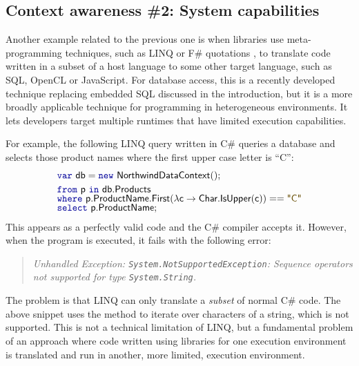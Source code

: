 
\subsection{Context awareness \#2: System capabilities}

Another example related to the previous one is when libraries use meta-programming techniques,
such as LINQ \cite{app-linq,app-linq-essence} or F\# quotations \cite{app-fsharp-metaprog}, to
translate code written in a subset of a host language to some other target language, such as SQL,
OpenCL or JavaScript. For database access, this is a recently developed technique replacing embedded
SQL discussed in the introduction, but it is a more broadly applicable technique for programming
in heterogeneous environments. It lets developers target multiple runtimes that have limited
execution capabilities.

For example, the following LINQ query written in C\# queries a database and
selects those product names where the first upper case letter is ``C'':
%
\begin{equation*}
\begin{array}{l}
\kvd{var}~\ident{db} = \kvd{new}~\ident{NorthwindDataContext}();\\[0.25em]
\kvd{from}~\ident{p}~\kvd{in}~\ident{db.Products}\\[-0.25em]
\kvd{where}~\ident{p.ProductName.First}(\lambda \ident{c} \rightarrow \ident{Char.IsUpper}(\ident{c})) == \str{C}\\[-0.25em]
\kvd{select}~\ident{p.ProductName};
\end{array}
\end{equation*}
%
This appears as a perfectly valid code and the C\# compiler accepts it. However, when the program
is executed, it fails with the following error:
%
\begin{quote}
\emph{Unhandled Exception: \texttt{System.NotSupportedException}: Sequence operators
not supported for type \texttt{System.String}.}
\end{quote}
%
The problem is that LINQ can only translate a \emph{subset} of normal C\# code. The above snippet
uses the  method to iterate over characters of a string, which is not supported. This is
not a technical limitation of LINQ, but a fundamental problem of an approach where code written 
using libraries for one execution environment is translated and run in another, more limited, 
execution environment.

